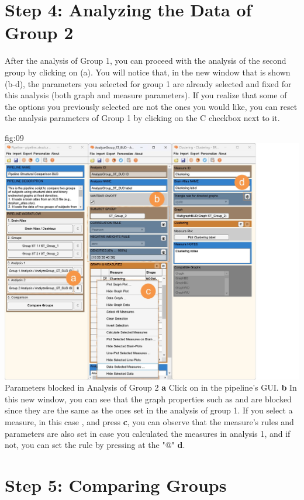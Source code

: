 \documentclass[justified]{tufte-handout}
\begin{document}
\section{Step 4: Analyzing the Data of Group 2}

After the analysis of Group 1, you can proceed with the analysis of the second group by clicking on  (a). You will notice that, in the new window that is shown (b-d), the parameters you selected for group 1 are already selected and fixed for this analysis (both graph and measure parameters). If you realize that some of the options you previously selected are not the ones you would like, you can reset the analysis parameters of Group 1 by clicking on the C checkbox next to it.

	{fig:09}
	{
	\includegraphics{fig09.jpg}
	}
	{Parameters blocked in Analysis of Group 2}
	{
	{\bf a} Click on  in the pipeline's GUI.
	{\bf b} In this new window, you can see that the graph properties such as  and  are blocked since they are the same as the ones set in the analysis of group 1. If you select a measure, in this case , and press  {\bf c}, you can observe that the measure's rules and parameters are also set in case you calculated the measures in analysis 1, and if not, you can set the rule by pressing at the "@" {\bf d}.
	}
 
\section{Step 5: Comparing Groups}
\end{document}
